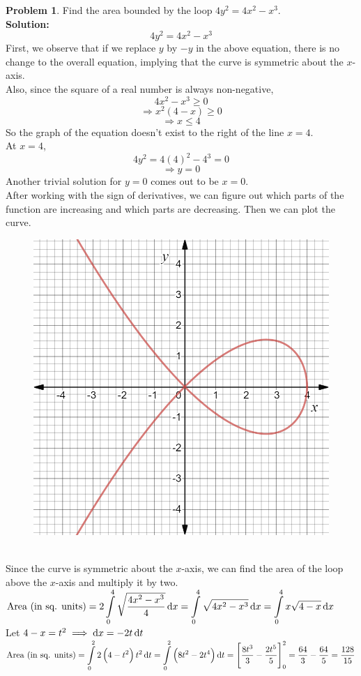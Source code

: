 \documentclass[14]{article}
\theoremstyle{definition}
\newtheorem{prob}{Problem}
\theoremstyle{case}
\begin{document}
\pagebreak
\begin{prob}
Find the area bounded by the loop $4y^2 = 4x^2 - x^3$.\\
\textbf{Solution:}\\
\[4y^2 = 4x^2 - x^3\]
First, we observe that if we replace $y$ by $-y$ in the above equation, there is no change to the overall equation, implying that the curve is symmetric about the $x$-axis.\\
Also, since the square of a real number is always non-negative,
\[4x^2 - x^3 \geq 0\]
\[\Rightarrow x^2(4-x) \geq 0\]
\[\Rightarrow x \leq 4\]
So the graph of the equation doesn't exist to the right of the line $x=4$.\\
At $x = 4$, 
\[4y^2 = 4(4)^2 - 4^3 = 0\]
\[\Rightarrow y = 0\]
Another trivial solution for $y=0$ comes out to be $x=0$.\\
After working with the sign of derivatives, we can figure out which parts of the function are increasing and which parts are decreasing. Then we can plot the curve.\\
\begin{figure}[h]\centering
\includegraphics[scale=.27]{images/loop}
\end{figure}\\
Since the curve is symmetric about the $x$-axis, we can find the area of the loop above the $x$-axis and multiply it by two.\\
$\text{Area (in sq. units)} = 2 \displaystyle\int\limits_0^4 \sqrt{\dfrac{4x^2 - x^3}{4}} \dif x = \int\limits_0^4 \sqrt{4x^2 - x^3} \dif x = \int\limits_0^4 x\sqrt{4-x} \dif x$\\
Let $4-x=t^2 \implies \dif x = -2t \dif t$\\
$\text{Area (in sq. units)} = \displaystyle\int\limits_0^2 2\left(4-t^2\right)t^2 \dif t = \int\limits_0^2 \left( 8t^2 -2t^4 \right) \dif t = \left[ \dfrac{8t^3}{3} - \dfrac{2t^5}{5} \right]_0^2 = \dfrac{64}{3} - \dfrac{64}{5} = \dfrac{128}{15}$
\end{prob}
\end{document}
